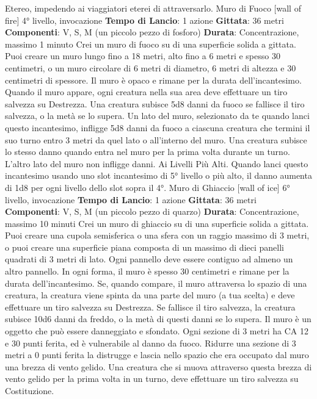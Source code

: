 \begin{multicols}{2}
Etereo, impedendo ai viaggiatori eterei di attraversarlo.
Muro di Fuoco
[wall of fire]
4° livello, invocazione
\textbf{Tempo di Lancio}: 1 azione
\textbf{Gittata}: 36 metri
\textbf{Componenti}: V, S, M (un piccolo pezzo di fosforo)
\textbf{Durata}: Concentrazione, massimo 1 minuto
Crei un muro di fuoco su di una superficie solida a
gittata. Puoi creare un muro lungo fino a 18 metri, alto
fino a 6 metri e spesso 30 centimetri, o un muro
circolare di 6 metri di diametro, 6 metri di altezza e 30
centimetri di spessore. Il muro è opaco e rimane per la
durata dell’incantesimo.
Quando il muro appare, ogni creatura nella sua area
deve effettuare un tiro salvezza su Destrezza. Una
creatura subisce 5d8 danni da fuoco se fallisce il tiro
salvezza, o la metà se lo supera.
Un lato del muro, selezionato da te quando lanci questo
incantesimo, infligge 5d8 danni da fuoco a ciascuna
creatura che termini il suo turno entro 3 metri da quel
lato o all’interno del muro. Una creatura subisce lo
stesso danno quando entra nel muro per la prima volta
durante un turno. L’altro lato del muro non infligge
danni.
Ai Livelli Più Alti. Quando lanci questo incantesimo
usando uno slot incantesimo di 5° livello o più alto, il
danno aumenta di 1d8 per ogni livello dello slot sopra il
4°.
Muro di Ghiaccio
[wall of ice]
6° livello, invocazione
\textbf{Tempo di Lancio}: 1 azione
\textbf{Gittata}: 36 metri
\textbf{Componenti}: V, S, M (un piccolo pezzo di quarzo)
\textbf{Durata}: Concentrazione, massimo 10 minuti
Crei un muro di ghiaccio su di una superficie solida a
gittata. Puoi creare una cupola semisferica o una sfera
con un raggio massimo di 3 metri, o puoi creare una
superficie piana composta di un massimo di dieci
panelli quadrati di 3 metri di lato. Ogni pannello deve
essere contiguo ad almeno un altro pannello. In ogni
forma, il muro è spesso 30 centimetri e rimane per la
durata dell’incantesimo.
Se, quando compare, il muro attraversa lo spazio di una
creatura, la creatura viene spinta da una parte del muro
(a tua scelta) e deve effettuare un tiro salvezza su
Destrezza. Se fallisce il tiro salvezza, la creatura
subisce 10d6 danni da freddo, o la metà di questi danni
se lo supera.
Il muro è un oggetto che può essere danneggiato e
sfondato. Ogni sezione di 3 metri ha CA 12 e 30 punti
ferita, ed è vulnerabile al danno da fuoco. Ridurre una
sezione di 3 metri a 0 punti ferita la distrugge e lascia
nello spazio che era occupato dal muro una brezza di
vento gelido. Una creatura che si muova attraverso
questa brezza di vento gelido per la prima volta in un
turno, deve effettuare un tiro salvezza su Costituzione.

\end{multicols}
